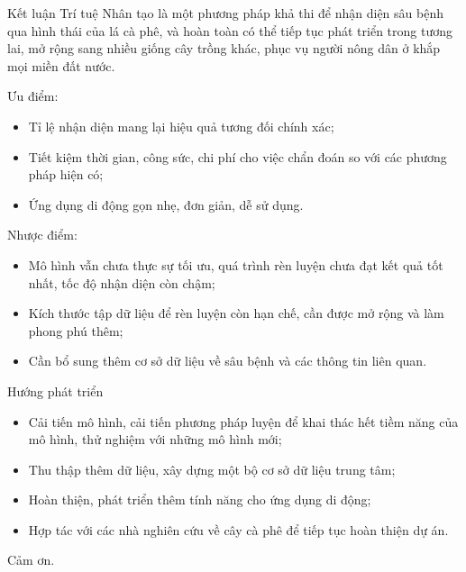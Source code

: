 \documentclass{beamer}
\begin{document}
\begin{frame}[allowframebreaks]{Kết luận}
	Trí tuệ Nhân tạo là một phương pháp khả thi để nhận diện sâu bệnh qua hình thái của lá cà phê, và hoàn toàn có thể tiếp tục phát triển trong tương lai, mở rộng sang nhiều giống cây trồng khác, phục vụ người nông dân ở khắp mọi miền đất nước.

	\framebreak

	Ưu điểm:
	\begin{itemize}
		\item Tỉ lệ nhận diện mang lại hiệu quả tương đối chính xác;
		\item Tiết kiệm thời gian, công sức, chi phí cho việc chẩn đoán so với các phương pháp hiện có;
		\item Ứng dụng di động gọn nhẹ, đơn giản, dễ sử dụng.
	\end{itemize}

	\framebreak

	Nhược điểm:
	\begin{itemize}
		\item Mô hình vẫn chưa thực sự tối ưu, quá trình rèn luyện chưa đạt kết quả tốt nhất, tốc độ nhận diện còn chậm;
		\item Kích thước tập dữ liệu để rèn luyện còn hạn chế, cần được mở rộng và làm phong phú thêm;
		\item Cần bổ sung thêm cơ sở dữ liệu về sâu bệnh và các thông tin liên quan.
	\end{itemize}

	\framebreak

	Hướng phát triển 
	\begin{itemize}
		\item Cải tiến mô hình, cải tiến phương pháp luyện để khai thác hết tiềm năng của mô hình, thử nghiệm với những mô hình mới;
		\item Thu thập thêm dữ liệu, xây dựng một bộ cơ sở dữ liệu trung tâm;
		\item Hoàn thiện, phát triển thêm tính năng cho ứng dụng di động;
		\item Hợp tác với các nhà nghiên cứu về cây cà phê để tiếp tục hoàn thiện dự án.
	\end{itemize}

\end{frame}

\begin{frame}
	\centering \Large
	Cảm ơn.
\end{frame}
\end{document}
